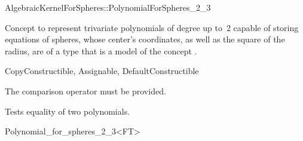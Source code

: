 \begin{ccRefConcept}{AlgebraicKernelForSpheres::PolynomialForSpheres_2_3}

\ccDefinition

Concept to represent
trivariate polynomials of degree up to~2 capable of storing equations
of spheres, whose center's coordinates, as well as the square of the radius, 
are of a type that is a model of the concept
.

\ccRefines
CopyConstructible, Assignable, DefaultConstructible

\ccCreation
{}




\ccOperations

The comparison operator \ccc{==} must be provided. 

{Tests equality of two polynomials.}

\ccHasModels


\ccSeeAlso


\end{ccRefConcept}

\begin{ccRefClass}{Polynomial_for_spheres_2_3<FT>}


\ccIsModel


\ccSeeAlso


\end{ccRefClass}
